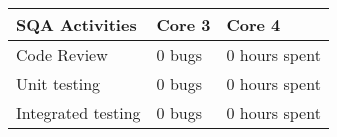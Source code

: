 \begin{adjustbox}{center}
\begin{tabular}{l|l|l}%
    SQA Activities & Core 3 & Core 4  \\ \hline
    Code Review
    & 0 bugs
    & 0 hours spent \\ \hline
    Unit testing
    & 0 bugs
    & 0 hours spent \\ \hline
    Integrated testing
    & 0 bugs
    & 0 hours spent
   
\end{tabular}
\end{adjustbox}